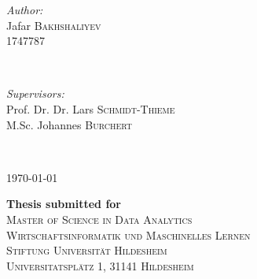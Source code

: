 \documentclass[a4paper,12pt]{report}
\begin{document}
\begin{titlepage}

\begin{minipage}{0.49\textwidth}
\begin{flushleft} \large
\emph{Author:}\\
Jafar \textsc{Bakhshaliyev} \\ %
1747787 \\ %
\end{flushleft}
\end{minipage}
~
\begin{minipage}{0.46\textwidth}
\begin{flushright} \large
\emph{Supervisors:} \\
Prof. Dr. Dr. Lars \textsc{Schmidt-Thieme} \\
M.Sc. Johannes \textsc{Burchert} \\ %
\end{flushright}
\end{minipage}\\
\vspace{2cm}


{ \today}\\ %
\vspace{1cm}

{ \large \bfseries Thesis submitted for}\\  %
\vspace{0.3cm}
\textsc{\Large Master of Science in Data Analytics}\\%
\vspace{1cm}
\textsc{\large Wirtschaftsinformatik und Maschinelles Lernen}\\ %
\vspace{0.3cm}
\textsc{\large Stiftung Universität Hildesheim}\\ %
\vspace{0.3cm}
\textsc{\large Universitatsplätz 1, 31141 Hildesheim}\\ %
\vspace{0.3cm}


\vfill %

\end{titlepage}
\end{document}
